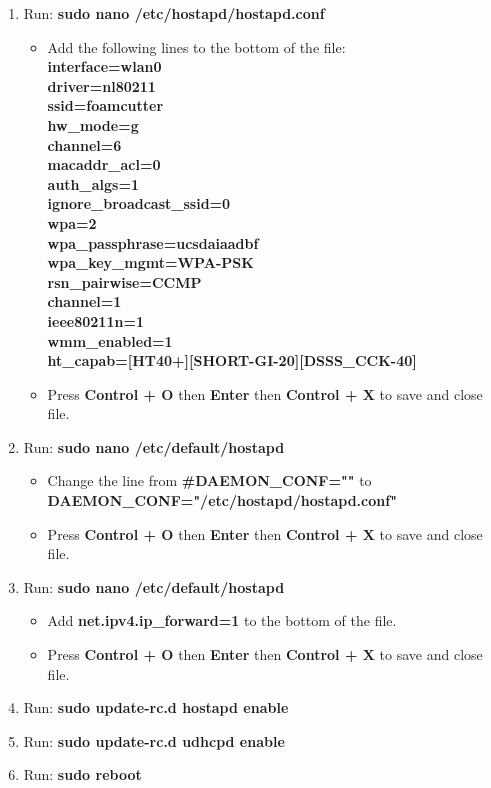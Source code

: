 \documentclass[titlepage,12pt,letter]{report}
\numberwithin{equation}{chapter}
\begin{document}
\begin{enumerate}[noitemsep,topsep=0pt]
	\item Run: \textbf{sudo nano /etc/hostapd/hostapd.conf}
	\begin{itemize}[noitemsep,topsep=0pt]
		\item Add the following lines to the bottom of the file:\\
		\textbf{interface=wlan0} \\
		\textbf{driver=nl80211}\\
		\textbf{ssid=foamcutter}\\
		\textbf{hw\_mode=g}\\
		\textbf{channel=6}\\
		\textbf{macaddr\_acl=0}\\
		\textbf{auth\_algs=1}\\
		\textbf{ignore\_broadcast\_ssid=0}\\
		\textbf{wpa=2}\\
		\textbf{wpa\_passphrase=ucsdaiaadbf}\\
		\textbf{wpa\_key\_mgmt=WPA-PSK} \\   
		\textbf{rsn\_pairwise=CCMP}\\
		
		\textbf{channel=1}\\
		\textbf{ieee80211n=1}    \\     
		\textbf{wmm\_enabled=1}    \\ 
		\textbf{ht\_capab=[HT40+][SHORT-GI-20][DSSS\_CCK-40]}
		\item Press \textbf{Control + O} then \textbf{Enter} then \textbf{Control + X} to save and close file.
	\end{itemize}

	\item Run: \textbf{sudo nano /etc/default/hostapd}
	\begin{itemize}[noitemsep,topsep=0pt]
		\item Change the line from \textbf{\#DAEMON\_CONF=""} to \\ \textbf{DAEMON\_CONF="/etc/hostapd/hostapd.conf"}
		\item Press \textbf{Control + O} then \textbf{Enter} then \textbf{Control + X} to save and close file.
	\end{itemize}

	\item Run: \textbf{sudo nano /etc/default/hostapd}
	\begin{itemize}[noitemsep,topsep=0pt]
		\item Add \textbf{net.ipv4.ip\_forward=1} to the bottom of the file.
		\item Press \textbf{Control + O} then \textbf{Enter} then \textbf{Control + X} to save and close file.
	\end{itemize}

	\item Run: \textbf{sudo update-rc.d hostapd enable}
	\item Run: \textbf{sudo update-rc.d udhcpd enable}
	\item Run: \textbf{sudo reboot}	
\end{enumerate}
\end{document}

